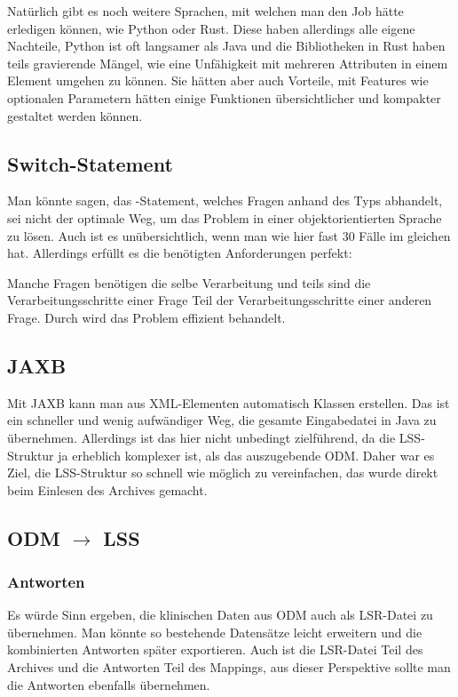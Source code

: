 Natürlich gibt es noch weitere Sprachen, mit welchen man den Job hätte erledigen können, wie Python oder Rust.
Diese haben allerdings alle eigene Nachteile, Python ist oft langsamer als Java und die Bibliotheken in Rust haben teils gravierende Mängel, wie eine Unfähigkeit mit mehreren Attributen in einem Element umgehen zu können.
Sie hätten aber auch Vorteile, mit Features wie optionalen Parametern hätten einige Funktionen übersichtlicher und kompakter gestaltet werden können.

\subsection{Switch-Statement}

Man könnte sagen, das -Statement, welches Fragen anhand des Typs abhandelt, sei nicht der optimale Weg, um das Problem in einer objektorientierten Sprache zu lösen.
Auch ist es unübersichtlich, wenn man wie hier fast 30 Fälle im gleichen  hat.
Allerdings erfüllt es die benötigten Anforderungen perfekt:

Manche Fragen benötigen die selbe Verarbeitung und teils sind die Verarbeitungsschritte einer Frage Teil der Verarbeitungsschritte einer anderen Frage.
Durch  wird das Problem effizient behandelt.

\subsection{JAXB}

Mit JAXB kann man aus XML-Elementen automatisch Klassen erstellen. Das ist ein schneller und wenig aufwändiger Weg, die gesamte Eingabedatei in Java zu übernehmen.
Allerdings ist das hier nicht unbedingt zielführend, da die LSS-Struktur ja erheblich komplexer ist, als das auszugebende ODM.
Daher war es Ziel, die LSS-Struktur so schnell wie möglich zu vereinfachen, das wurde direkt beim Einlesen des Archives gemacht.

\subsection{ODM $\rightarrow$ LSS}

\subsubsection{Antworten}

Es würde Sinn ergeben, die klinischen Daten aus ODM auch als LSR-Datei zu übernehmen.
Man könnte so bestehende Datensätze leicht erweitern und die kombinierten Antworten später exportieren.
Auch ist die LSR-Datei Teil des Archives und die Antworten Teil des Mappings, aus dieser Perspektive sollte man die Antworten ebenfalls übernehmen.

